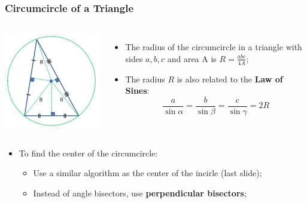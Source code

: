 \begin{frame}
  \frametitle{Circumcircle of a Triangle}
  \begin{columns}
    \includegraphics[width=1\textwidth]{../img/circumcircle_halim}
    \begin{itemize}
      \item The radius of the circumcircle in a triangle with sides $a,b,c$ and area A is $R = \frac{abc}{4A}$;
      \item The radius $R$ is also related to the {\bf Law of Sines}:
      \begin{equation*}
        \frac{a}{\sin{\alpha}} = \frac{b}{\sin{\beta}} = \frac{c}{\sin{\gamma}} = 2R
      \end{equation*}
    \end{itemize}
    \end{columns}\bigskip
    \begin{itemize}
      \item To find the center of the circumcircle:
      \begin{itemize}
        \item Use a similar algorithm as the center of the incirle (last slide);\medskip
        \item Instead of angle bisectors, use {\bf perpendicular bisectors};
      \end{itemize}
    \end{itemize}
\end{frame}


